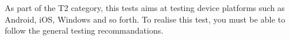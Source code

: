 \begin{itshape}
As part of the T2 category, this tests aims at testing device platforms such as Android, iOS, Windows and so forth.
To realise this test, you must be able to follow the general testing recommandations.
\end{itshape}
\newline
